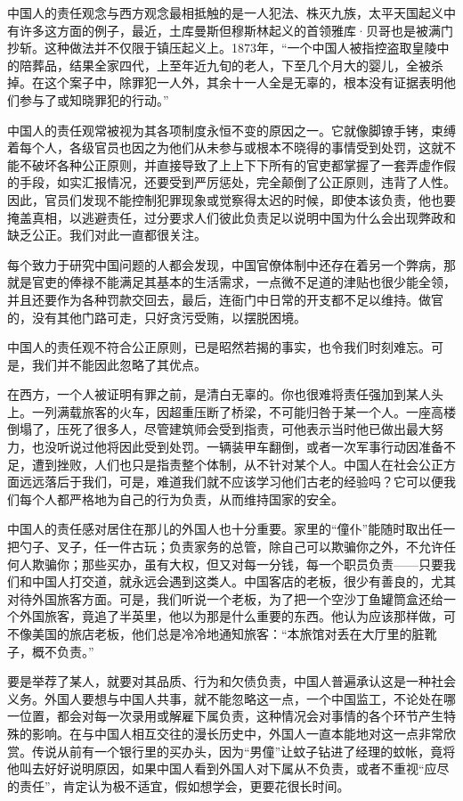 \documentclass[12pt,oneside]{book}
\begin{document}
\begin{common-format}
中国人的责任观念与西方观念最相抵触的是一人犯法、株灭九族，太平天国起义中有许多这方面的例子，最近，土库曼斯但穆斯林起义的首领雅库·贝哥也是被满门抄斩。这种做法并不仅限于镇压起义上。1873年，“一个中国人被指控盗取皇陵中的陪葬品，结果全家四代，上至年近九旬的老人，下至几个月大的婴儿，全被杀掉。在这个案子中，除罪犯一人外，其余十一人全是无辜的，根本没有证据表明他们参与了或知晓罪犯的行动。” 

中国人的责任观常被视为其各项制度永恒不变的原因之一。它就像脚镣手铐，束缚着每个人，各级官员也因之为他们从未参与或根本不晓得的事情受到处罚，这就不能不破坏各种公正原则，并直接导致了上上下下所有的官吏都掌握了一套弄虚作假的手段，如实汇报情况，还要受到严厉惩处，完全颠倒了公正原则，违背了人性。因此，官员们发现不能控制犯罪现象或觉察得太迟的时候，即使本该负责，他也要掩盖真相，以逃避责任，过分要求人们彼此负责足以说明中国为什么会出现弊政和缺乏公正。我们对此一直都很关注。 

每个致力于研究中国问题的人都会发现，中国官僚体制中还存在着另一个弊病，那就是官吏的俸禄不能满足其基本的生活需求，一点微不足道的津贴也很少能全领，并且还要作为各种罚款交回去，最后，连衙门中日常的开支都不足以维持。做官的，没有其他门路可走，只好贪污受贿，以摆脱困境。 

中国人的责任观不符合公正原则，已是昭然若揭的事实，也令我们时刻难忘。可是，我们并不能因此忽略了其优点。 

在西方，一个人被证明有罪之前，是清白无辜的。你也很难将责任强加到某人头上。一列满载旅客的火车，因超重压断了桥梁，不可能归咎于某一个人。一座高楼倒塌了，压死了很多人，尽管建筑师会受到指责，可他表示当时他已做出最大努力，也没听说过他将因此受到处罚。一辆装甲车翻倒，或者一次军事行动因准备不足，遭到挫败，人们也只是指责整个体制，从不针对某个人。中国人在社会公正方面远远落后于我们，可是，难道我们就不应该学习他们古老的经验吗？它可以便我们每个人都严格地为自己的行为负责，从而维持国家的安全。 

中国人的责任感对居住在那儿的外国人也十分重要。家里的“僮仆”能随时取出任一把勺子、叉子，任一件古玩；负责家务的总管，除自己可以欺骗你之外，不允许任何人欺骗你；那些买办，虽有大权，但又对每一分钱，每一个职员负责——只要我们和中国人打交道，就永远会遇到这类人。中国客店的老板，很少有善良的，尤其对待外国旅客方面。可是，我们听说一个老板，为了把一个空沙丁鱼罐筒盒还给一个外国旅客，竟追了半英里，他以为那是什么重要的东西。他认为应该那样做，可不像美国的旅店老板，他们总是冷冷地通知旅客：“本旅馆对丢在大厅里的脏靴子，概不负责。” 

要是举荐了某人，就要对其品质、行为和欠债负责，中国人普遍承认这是一种社会义务。外国人要想与中国人共事，就不能忽略这一点，一个中国监工，不论处在哪一位置，都会对每一次录用或解雇下属负责，这种情况会对事情的各个环节产生特殊的影响。在与中国人相互交往的漫长历史中，外国人一直本能地对这一点非常欣赏。传说从前有一个银行里的买办头，因为“男僮”让蚊子钻进了经理的蚊帐，竟将他叫去好好说明原因，如果中国人看到外国人对下属从不负责，或者不重视“应尽的责任”，肯定认为极不适宜，假如想学会，更要花很长时间。 


\end{common-format}
\end{document}
